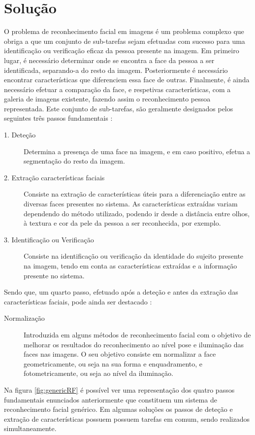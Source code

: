 \section{Solução} \label{solucao}
O problema de reconhecimento facial em imagens é um problema complexo que obriga a que um conjunto de sub-tarefas sejam efetuadas com sucesso para uma identificação ou verificação eficaz da pessoa presente na imagem. Em primeiro lugar, é necessário determinar onde se encontra a face da pessoa a ser identificada, separando-a do resto da imagem. Posteriormente é necessário encontrar características que diferenciem essa face de outras. Finalmente, é ainda necessário efetuar a comparação da face, e respetivas características, com a galeria de imagens existente, fazendo assim o reconhecimento pessoa representada. Este conjunto de sub-tarefas, são geralmente designados pelos seguintes três passos fundamentais \citep{Zhao2003}:
\begin{description}
\item[1. Deteção]
Determina a presença de uma face na imagem, e em caso positivo, efetua a segmentação do resto da imagem.

\item[2. Extração características faciais]
Consiste na extração de características úteis para a diferenciação entre as diversas faces presentes no sistema. As características extraídas variam dependendo do método utilizado, podendo ir desde a distância entre olhos, à textura e cor da pele da pessoa a ser reconhecida, por exemplo.

\item[3. Identificação ou Verificação]
Consiste na identificação ou verificação da identidade do sujeito presente na imagem, tendo em conta as características extraídas e a informação presente no sistema.
\end{description}

Sendo que, um quarto passo, efetuado após a deteção e antes da extração das características faciais, pode ainda ser destacado \citep{Li2011}:
\begin{description}
\item[Normalização]
Introduzida em alguns métodos de reconhecimento facial com o objetivo de melhorar os resultados do reconhecimento ao nível pose e iluminação das faces nas imagens. O seu objetivo consiste em normalizar a face geometricamente, ou seja na sua forma e enquadramento, e fotometricamente, ou seja ao nível da iluminação.
\end{description}
Na figura \ref{fig:genericRF} é possível ver uma representação dos quatro passos fundamentais enunciados anteriormente que constituem um sistema de reconhecimento facial genérico. Em algumas soluções os passos de deteção e extração de características possuem possuem tarefas em comum, sendo realizados simultaneamente.

